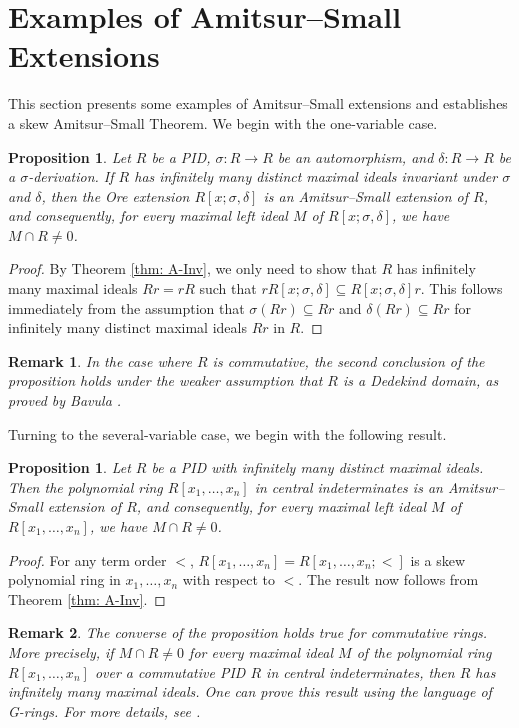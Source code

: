 \documentclass[11pt,a4paper]{article}
\theoremstyle{theorem}
\newtheorem{proposition}[theorem]{Proposition}
\newtheorem{remark}{Remark}[section]
\numberwithin{equation}{section}
\newcommand{\s}{\sigma}
\begin{document}
	\section{Examples of Amitsur--Small Extensions}\label{sec: examples}
		This section presents some examples of Amitsur--Small extensions and establishes a skew Amitsur--Small Theorem. 
		We begin with the one-variable case.  
	\begin{proposition}\label{prop: AS_R[x,s,d]}
		Let $R$ be a PID, $\s:R\to R$ be an automorphism, and $\delta:R\to R$ be a $\s$-derivation. If $R$ has infinitely many distinct maximal ideals invariant under $\s$ and $\delta$, then the Ore extension $R[x;\s,\delta]$ is an Amitsur--Small extension of \(R\), and consequently, for every maximal left ideal \(M\) of $R[x;\s,\delta]$, we have \(M\cap R\neq 0\). 
	\end{proposition}
	\begin{proof}
		By Theorem \ref{thm: A-Inv}, we only need to show that \(R\) has infinitely many maximal ideals $Rr=rR$ such that $rR[x;\s,\delta]\subseteq R[x;\s,\delta]r$. This follows immediately from the assumption that \(\s(Rr)\subseteq Rr\) and \(\delta(Rr)\subseteq Rr\) for  infinitely many distinct maximal ideals \(Rr\) in \(R\).  
	\end{proof}
	
	\begin{remark}
		In the case where $R$ is commutative, the second conclusion of the proposition holds under the weaker assumption that $R$ is a Dedekind domain, as proved by Bavula \cite[Theorem 1.2]{Bavula}.
	\end{remark}
	
	Turning to the several-variable case, we begin with the following result. 
	\begin{proposition}\label{prop: lemmaC}
		Let $R$ be a PID with infinitely many distinct maximal ideals. Then the polynomial ring $R[x_1,\dots,x_n]$ in central indeterminates is an Amitsur--Small extension of \(R\), and consequently, for every maximal left ideal $M$ of $R[x_1,\dots,x_n]$, we have $M\cap R\neq 0$. 
	\end{proposition}
	\begin{proof}
		For any term order \(<\), $R[x_1,\dots,x_n] = R[x_1,\dots,x_n;<]$ is a skew polynomial ring in \(x_1,\dots,x_n\) with respect to \(<\). The result now follows from Theorem \ref{thm: A-Inv}. 
	\end{proof}
	\begin{remark}
		The converse of the proposition holds true for commutative rings. More precisely, if $M\cap R\neq 0$ for every maximal ideal $M$ of the polynomial ring $R[x_1,\dots,x_n]$ over a commutative PID $R$ in central indeterminates,  then $R$ has infinitely many maximal ideals. One can prove this result using the language of G-rings. For more details, see \cite[Theorem 27 and Theorem 147]{kaplansky2006commutative}.
	\end{remark}
\end{document}
